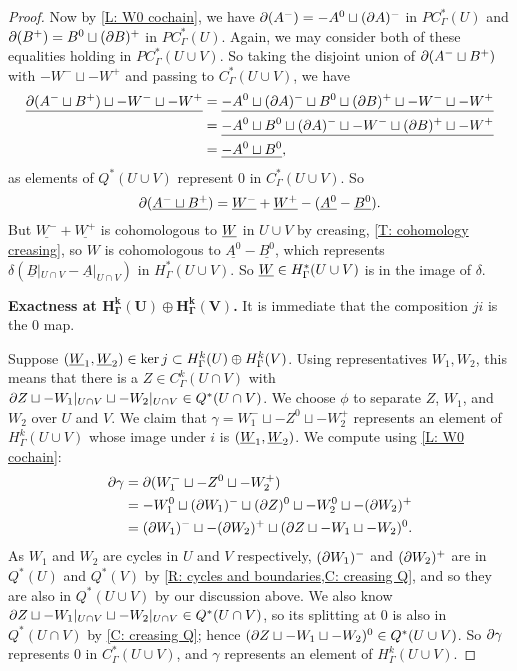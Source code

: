 \begin{proof}
	Now by \cref{L: W0 cochain}, we have $\partial(A^-) =  -A^0 \sqcup (\partial A)^-$ in $PC^*_\Gamma(U)$ and $\partial (B^+) = B^0 \sqcup (\partial B)^+$ in $PC^*_\Gamma(U)$.
	Again, we may consider both of these equalities holding in $PC^*_\Gamma(U \cup V)$.
	So taking the disjoint union of $\partial(A^- \sqcup B^+)$ with $- W^- \sqcup - W^+$ and passing to $C^*_\Gamma(U \cup V)$, we have
	\begin{align*}
		\underline{	\partial(A^- \sqcup B^+) \sqcup - W^- \sqcup - W^+} &= \underline{-A^0 \sqcup (\partial A)^- \sqcup B^0 \sqcup (\partial B)^+ \sqcup - W^- \sqcup - W^+ }\\
		&=  \underline{-A^0  \sqcup B^0 \sqcup (\partial A)^- \sqcup - W^- \sqcup (\partial B)^+  \sqcup - W^+ }\\
		&= \underline{-A^0  \sqcup B^0},
	\end{align*}
	as elements of $Q^*(U \cup V)$ represent $0$ in $C^*_\Gamma(U \cup V)$.
	So
		\[	\partial (\underline{A^- \sqcup B^+}) =  \underline{W^-} + \underline{W^+} -(\underline{A^0}-\underline{B^0}).\]
	But $\underline{W^-} + \underline{W^+}$ is cohomologous to $\underline{W}$ in $U \cup V$ by creasing, \cref{T: cohomology creasing}, so $W$ is cohomologous to $\underline{A^0}-\underline{B^0}$, which represents $\delta(\underline{B}|_{U \cap V}-\underline{A}|_{U \cap V})$ in $H^*_\Gamma(U \cup V)$.
	So $\underline{W} \in H^*_\Gamma(U \cup V)$ is in the image of $\delta$.

	\textbf{Exactness at $\mathbf{H^k_\Gamma(U) \oplus H^k_\Gamma(V)}$.}
	It is immediate that the composition $ji$ is the $0$ map.

	Suppose $(\underline{W}_1,\underline{W}_2) \in \ker j \subset H^k_\Gamma(U) \oplus H^k_\Gamma(V)$.
	Using representatives $W_1,W_2$, this means that there is a $Z \in C^k_\Gamma(U \cap V)$ with $\partial Z \sqcup - W_1|_{U \cap V} \sqcup - W_2|_{U \cap V} \in Q^*(U \cap V)$.
	We choose $\phi$ to separate $Z$, $W_1$, and $W_2$ over $U$ and $V$.
	We claim that $\gamma = W_1^- \sqcup -Z^0 \sqcup -W_2^+$ represents an element of $H^k_\Gamma(U \cup V)$ whose image under $i$ is $(\underline{W}_1,\underline{W}_2)$.
	We compute using \cref{L: W0 cochain}:
	\begin{align*}
	\partial \gamma& = \partial (W_1^- \sqcup - Z^0 \sqcup -W_2^+)\\
		& = -W_1^0 \sqcup (\partial W_1)^- \sqcup (\partial Z)^0 \sqcup - W_2^0 \sqcup - (\partial W_2)^+\\
		& =  (\partial W_1)^- \sqcup - (\partial W_2)^+ \sqcup (\partial Z \sqcup -W_1 \sqcup - W_2)^0.
	\end{align*}
	As $W_1$ and $W_2$ are cycles in $U$ and $V$ respectively, $(\partial W_1)^-$ and $(\partial W_2)^+$ are in $Q^*(U)$ and $Q^*(V)$ by \cref{R: cycles and boundaries,C: creasing Q}, and so they are also in $Q^*(U \cup V)$ by our discussion above.
	We also know $\partial Z \sqcup - W_1|_{U \cap V} \sqcup - W_2|_{U \cap V} \in Q^*(U \cap V)$, so its splitting at $0$ is also in $Q^*(U \cap V)$ by \cref{C: creasing Q}; hence $(\partial Z \sqcup -W_1 \sqcup - W_2)^0 \in Q^*(U \cup V)$.
	So $\partial \gamma$ represents $0$ in $C^*_\Gamma(U \cup V)$, and $\gamma$ represents an element of $H^k_\Gamma(U \cup V)$.


\end{proof}
